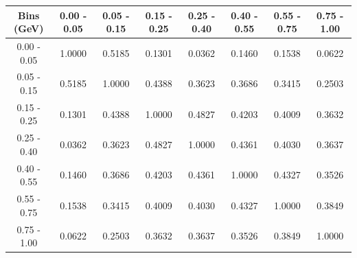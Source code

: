 \documentclass[aps, prd, reprint,showpacs,  preprintnumbers,amsmath,amssymb,superscriptaddress, nofootinbib]{revtex4-1}
\makeatletter
\renewenvironment{table}
  {\def\@captype{table}}
  {}
\makeatother
\begin{document}
\begin{table}
\centering
\begin{tabular}{cccccccc}
\hline
    Bins (GeV) &  0.00 - 0.05 &  0.05 - 0.15 &  0.15 - 0.25 &  0.25 - 0.40 &  0.40 - 0.55 &  0.55 - 0.75 &  0.75 - 1.00 \\ 
\hline
  0.00 -  0.05  & 1.0000  & 0.5185  & 0.1301  & 0.0362  & 0.1460  & 0.1538  & 0.0622 \\
  0.05 -  0.15  & 0.5185  & 1.0000  & 0.4388  & 0.3623  & 0.3686  & 0.3415  & 0.2503 \\
  0.15 -  0.25  & 0.1301  & 0.4388  & 1.0000  & 0.4827  & 0.4203  & 0.4009  & 0.3632 \\
  0.25 -  0.40  & 0.0362  & 0.3623  & 0.4827  & 1.0000  & 0.4361  & 0.4030  & 0.3637 \\
  0.40 -  0.55  & 0.1460  & 0.3686  & 0.4203  & 0.4361  & 1.0000  & 0.4327  & 0.3526 \\
  0.55 -  0.75  & 0.1538  & 0.3415  & 0.4009  & 0.4030  & 0.4327  & 1.0000  & 0.3849 \\
  0.75 -  1.00  & 0.0622  & 0.2503  & 0.3632  & 0.3637  & 0.3526  & 0.3849  & 1.0000 \\
\hline
\hline
\end{tabular}
\caption{Correlation matrix for bins of $d\sigma/dT_\pi$.}
\label{tb:piz_kinetic_cov}
\end{table}

\vspace{0.7cm}
\end{document}

